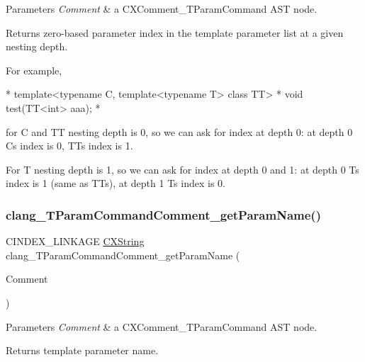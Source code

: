 \begin{DoxyParams}{Parameters}
{\em Comment} & a {\ttfamily C\+X\+Comment\+\_\+\+T\+Param\+Command} A\+ST node.\\
\hline
\end{DoxyParams}
\begin{DoxyReturn}{Returns}
zero-\/based parameter index in the template parameter list at a given nesting depth.
\end{DoxyReturn}
For example, \begin{DoxyVerb}*     template<typename C, template<typename T> class TT>
*     void test(TT<int> aaa);
* \end{DoxyVerb}
 for C and TT nesting depth is 0, so we can ask for index at depth 0\+: at depth 0 C\textquotesingle{}s index is 0, TT\textquotesingle{}s index is 1.

For T nesting depth is 1, so we can ask for index at depth 0 and 1\+: at depth 0 T\textquotesingle{}s index is 1 (same as TT\textquotesingle{}s), at depth 1 T\textquotesingle{}s index is 0. \mbox{\label{group__CINDEX__COMMENT_ga01f61f1d0dabcaf806eb1b9f21e5e340}} 
\subsubsection{\texorpdfstring{clang\+\_\+\+T\+Param\+Command\+Comment\+\_\+get\+Param\+Name()}{clang\_TParamCommandComment\_getParamName()}}
{\footnotesize\ttfamily C\+I\+N\+D\+E\+X\+\_\+\+L\+I\+N\+K\+A\+GE \hyperlink{structCXString}{C\+X\+String} clang\+\_\+\+T\+Param\+Command\+Comment\+\_\+get\+Param\+Name (\begin{DoxyParamCaption}\item[{\hyperlink{structCXComment}{C\+X\+Comment}}]{Comment }\end{DoxyParamCaption})}


\begin{DoxyParams}{Parameters}
{\em Comment} & a {\ttfamily C\+X\+Comment\+\_\+\+T\+Param\+Command} A\+ST node.\\
\hline
\end{DoxyParams}
\begin{DoxyReturn}{Returns}
template parameter name. 
\end{DoxyReturn}
\mbox{\label{group__CINDEX__COMMENT_ga1f6e7538a646824f3dde65d634de753f}} 

